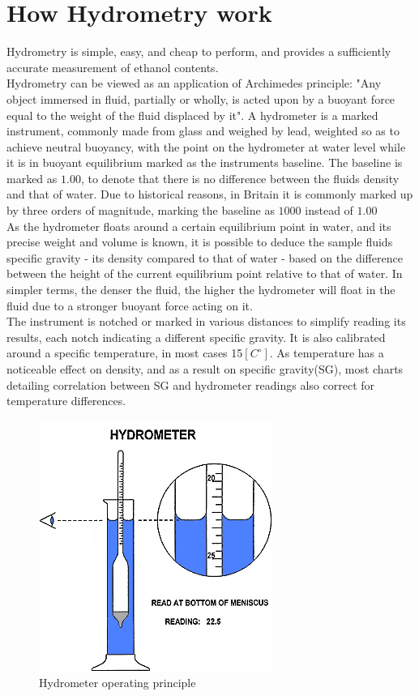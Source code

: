 \documentclass[twoside]{ctuthesis}
\theoremstyle{plain}
\theoremstyle{definition}
\theoremstyle{note}
\begin{document}
\section{How Hydrometry work}
Hydrometry is simple, easy, and cheap to perform, and provides a sufficiently accurate measurement of ethanol contents.\\
Hydrometry can be viewed as an application of Archimedes principle: "Any object immersed in fluid, partially or wholly, is acted upon by a buoyant force equal to the weight of the fluid displaced by it". A hydrometer is a marked instrument, commonly made from glass and weighed by lead\cite{Ethanol_Measurement}, weighted so as to achieve neutral buoyancy, with the point on the hydrometer at water level while it is in buoyant equilibrium marked as the instruments baseline. The baseline is marked as $1.00$, to denote that there is no difference between the fluids density and that of water. Due to historical reasons, in Britain it is commonly marked up by three orders of magnitude, marking the baseline as $1000$\cite{Brewing_Science} instead of $1.00$\\
As the hydrometer floats around a certain equilibrium point in water, and its precise weight and volume is known, it is possible to deduce the sample fluids specific gravity - its density compared to that of water - based on the difference between the height of the current equilibrium point relative to that of water. In simpler terms, the denser the fluid, the higher the hydrometer will float in the fluid due to a stronger buoyant force acting on it.\\
The instrument is notched or marked in various distances to simplify reading its results, each notch indicating a different specific gravity. It is also calibrated around a specific temperature, in most cases 15$[C^{\circ}]$\cite{Ethanol_Measurement}. As temperature has a noticeable effect on density, and as a result on specific gravity(SG), most charts detailing correlation between SG and hydrometer readings also correct for temperature differences.\\


\begin{figure}[H]
	\centering
	\includegraphics[scale=0.7]{hydrometer}
	\caption{Hydrometer operating principle \cite{Hydrometer_Pic}}
\end{figure}
\end{document}
